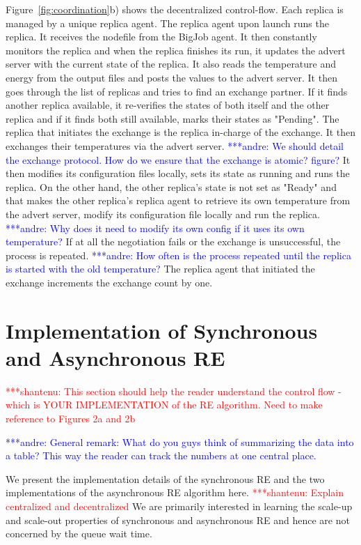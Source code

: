 \documentclass{rspublic}
\newcommand{\jhanote}[1]{ {\textcolor{red} { ***shantenu: #1 }}}
\newcommand{\alnote}[1]{ {\textcolor{blue} { ***andre: #1 }}}
\newcommand{\alnote}[1]{}
\newcommand{\jhanote}[1]{}
\begin{document}
Figure~\ref{fig:coordination}b) shows the decentralized control-flow. Each replica is managed by a unique replica agent. The replica agent upon launch runs the replica. It receives the nodefile from the BigJob agent. It then constantly monitors the replica and when the replica finishes its run, it updates the advert server with the current state of the replica. It also reads the temperature and energy from the output files and posts the values to the advert server. It then goes through the list of replicas and tries to find an exchange partner. If it finds another replica available, it re-verifies the states of both itself and the other replica and if it finds both still available, marks their states as "Pending". The replica that initiates the exchange is the replica in-charge of the exchange. It then exchanges their temperatures via the advert server. \alnote{We should detail the exchange protocol. How do we ensure that the exchange is atomic? figure?}
It then modifies its configuration files locally, sets its state as running and runs the replica. On the other hand, the other replica's state is not set as "Ready" and that makes the other replica's replica agent to retrieve its own temperature from the advert server, modify its configuration file locally and run the replica. \alnote{Why does it need to modify its own config if it uses its own temperature?} If at all the negotiation fails or the exchange is unsuccessful, the process is repeated. \alnote{How often is the process repeated until the replica is started with the old temperature?} The replica agent that initiated the exchange increments the exchange count by one. 


\section{Implementation of Synchronous and Asynchronous RE}

\jhanote{This section should help the reader understand the control
  flow - which is YOUR IMPLEMENTATION of the RE algorithm. Need to
  make reference to Figures 2a and 2b}

\alnote{General remark: What do you guys think of summarizing the data into 
a table? This way the reader can track the numbers at one central place.}

We present the implementation details of the synchronous RE and the
two implementations of the asynchronous RE algorithm here.
\jhanote{Explain centralized and decentralized}
We are primarily interested in learning the scale-up and scale-out
properties of synchronous and asynchronous RE and hence are not
concerned by the queue wait time. %
\end{document}
